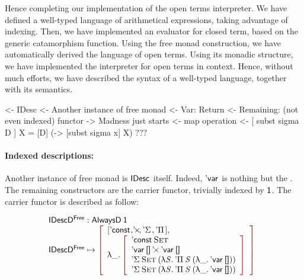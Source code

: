 Hence completing our implementation of the open terms interpreter. We
have defined a well-typed language of arithmetical expressions, taking
advantage of indexing. Then, we have implemented an evaluator for
closed term, based on the generic catamorphism function. Using the
free monad construction, we have automatically derived the language of
open terms. Using its monadic structure, we have implemented the
interpreter for open terms in context. Hence, without much efforts, we
have described the syntax of a well-typed language, together with its
semantics.

\begin{wstructure}
<- IDesc
    <- Another instance of free monad
        <- Var: Return
        <- Remaining: (not even indexed) functor
    -> Madness just starts
        <- map operation
        <- [ subst sigma D ] X = [D] (\x -> [subst sigma x] X)
        ???
\end{wstructure}

\paragraph{Indexed descriptions:}

Another instance of free monad is $\IDesc{\!}$ itself. Indeed,
$\DVar{\!}$ is nothing but the \return. The remaining constructors are
the carrier functor, trivially indexed by $\Unit$. The carrier functor
is described as follow:

\[\stk{
\IDescFreeD : \ATagIDesc{\Unit} \\
\begin{array}{@{}ll}
\IDescFreeD \mapsto \bigRedBracket{\begin{array}{l}
                                [\DConst{\!},
                                 \DProd{\!}{\!},
                                 \DSigma{\!}{\!}, 
                                 \DPi{\!}{\!}] \red{,}\\
                                  \LAM{\_}\bigRedBracket{\begin{array}{l}
                                        \DConst{\Set}               \\
                                        \DProd{\DVar{\Void}}{\DVar{\Void}}  \\
                                        \DSigma{\Set}{(\LAM{\V{S}} \DPi{\V{S}}{(\LAM{\_} \DVar{\Void})})} \\
                                        \DSigma{\Set}{(\LAM{\V{S}} \DPi{\V{S}}{(\LAM{\_} \DVar{\Void})})}
                                    \end{array}}\end{array}}
\end{array}
}\]

